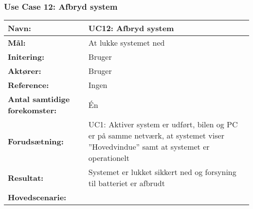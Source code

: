 \subsubsection{Use Case 12: Afbryd system}
\begin{table}[h]
\begin{tabularx}{\textwidth}{| >{\raggedright\arraybackslash}p{3.3 cm} | >{\raggedright\arraybackslash}X |} \hline

\textbf{Navn:} 						& UC12: Afbryd system																	\\ \hline
\textbf{Mål:}						& At lukke systemet ned 																\\ \hline
\textbf{Initering:}					& Bruger 																				\\ \hline
\textbf{Aktører:} 					& Bruger																				\\ \hline
\textbf{Reference:} 				& Ingen 																				\\ \hline
\textbf{Antal samtidige forekomster:} & Én 																					\\ \hline
\textbf{Forudsætning:} 				& UC1: Aktiver system er udført, bilen og PC er på samme netværk, at systemet viser ''Hovedvindue'' samt at systemet er operationelt 																												\\ \hline
\textbf{Resultat:}					& Systemet er lukket sikkert ned og forsyning til batteriet er afbrudt 					\\ \hline
\textbf{Hovedscenarie:}				& 


\end{tabularx}
\end{table}
